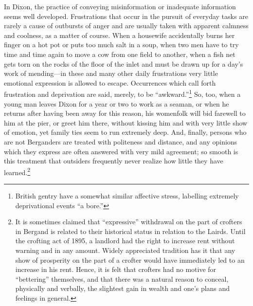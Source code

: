 \documentclass[twoside,symmetric,nobib,justified]{tufte-book}
\begin{document}
\noindent In Dixon, the practice of conveying misinformation or inadequate
information seems well developed. Frustrations that occur in the pursuit
of everyday tasks are rarely a cause of outbursts of anger and are
usually taken with apparent calmness and coolness, as a matter of
course. When a housewife accidentally burns her finger on a hot pot or
puts too much salt in a soup, when two men have to try time and time
again to move a cow from one field to another, when a fish net gets torn
on the rocks of the floor of the inlet and must be drawn up for a day's
work of mending---in these and many other daily frustrations very little
emotional expression is allowed to escape. Occurrences which call forth
frustration and deprivation are said, merely, to be
``awkward.''\footnote{British gentry have a somewhat similar affective
  stress, labelling extremely deprivational events ``a bore.''} So, too,
when a young man leaves Dixon for a year or two to work as a seaman, or
when he returns after having been away for this reason, his womenfolk
will bid farewell to him at the pier, or greet him there, without
kissing him and with very little show of emotion, yet family ties seem
to run extremely deep. And, finally, persons who are not Berganders are
treated with politeness and distance, and any opinions which they
express are often answered with very mild agreement; so smooth is this
treatment that outsiders frequently never realize how little they have
learned.\footnote{It is sometimes claimed that ``expressive'' withdrawal
  on the part of crofters in Bergand is related to their historical
  status in relation to the Lairds. Until the crofting act of 1895, a
  landlord had the right to increase rent without warning and in any
  amount. Widely appreciated tradition has it that any show of
  prosperity on the part of a crofter would have immediately led to an
  increase in his rent. Hence, it is felt that crofters had no motive
  for ``bettering'' themselves, and that there was a natural reason to
  conceal, physically and verbally, the slightest gain in wealth and
  one's plans and feelings in general.}
\end{document}
